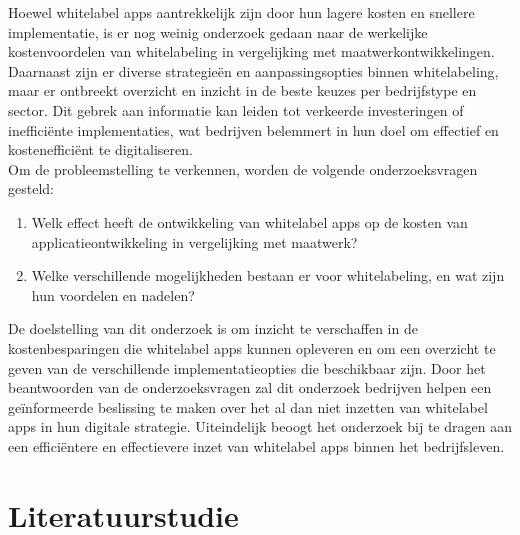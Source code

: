 Hoewel whitelabel apps aantrekkelijk zijn door hun lagere kosten en snellere implementatie, is er nog weinig onderzoek gedaan naar de werkelijke kostenvoordelen van whitelabeling in vergelijking met maatwerkontwikkelingen. 
Daarnaast zijn er diverse strategieën en aanpassingsopties binnen whitelabeling, maar er ontbreekt overzicht en inzicht in de beste keuzes per bedrijfstype en sector. 
Dit gebrek aan informatie kan leiden tot verkeerde investeringen of inefficiënte implementaties, wat bedrijven belemmert in hun doel om effectief en kostenefficiënt te digitaliseren.\\

Om de probleemstelling te verkennen, worden de volgende onderzoeksvragen gesteld:
\begin{enumerate}
  \item Welk effect heeft de ontwikkeling van whitelabel apps op de kosten van applicatieontwikkeling in vergelijking met maatwerk?
  \item Welke verschillende mogelijkheden bestaan er voor whitelabeling, en wat zijn hun voordelen en nadelen?
\end{enumerate}

De doelstelling van dit onderzoek is om inzicht te verschaffen in de kostenbesparingen die whitelabel apps kunnen opleveren en om een overzicht te geven van de verschillende implementatieopties die beschikbaar zijn. 
Door het beantwoorden van de onderzoeksvragen zal dit onderzoek bedrijven helpen een geïnformeerde beslissing te maken over het al dan niet inzetten van whitelabel apps in hun digitale strategie. 
Uiteindelijk beoogt het onderzoek bij te dragen aan een efficiëntere en effectievere inzet van whitelabel apps binnen het bedrijfsleven.


\section{Literatuurstudie}%
\label{sec:literatuurstudie}


